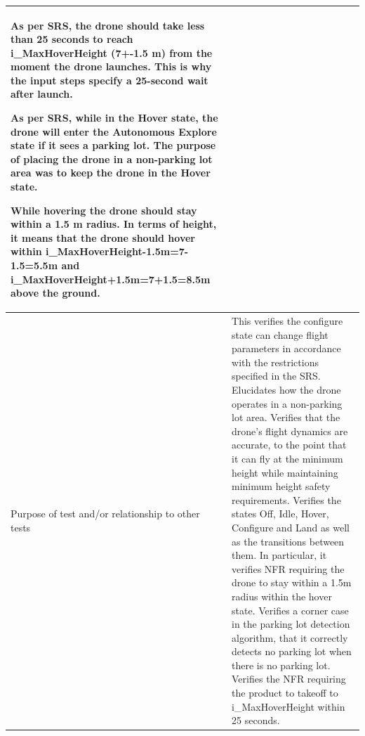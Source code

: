\documentclass[12pt, titlepage]{article}
\begin{document}
\begin{table}[!h]
\begin{center}
\begin{tabular}{ | m{1.5cm} | m{15cm} | }
As per SRS, the drone should take less than 25 seconds to reach i\_MaxHoverHeight (7+-1.5 m) from the moment the drone launches. This is why the input steps specify a 25-second wait after launch.

As per SRS, while in the Hover state, the drone will enter the Autonomous Explore state if it sees a parking lot. The purpose of placing the drone in a non-parking lot area was to keep the drone in the Hover state.

While hovering the drone should stay within a 1.5 m radius. In terms of height, it means that the drone should hover within i\_MaxHoverHeight-1.5m=7-1.5=5.5m and i\_MaxHoverHeight+1.5m=7+1.5=8.5m above the ground.  
\\ 
\hline
Purpose of test and/or relationship to other tests & This verifies the configure state can change flight parameters in accordance with the restrictions specified in the SRS. 
Elucidates how the drone operates in a non-parking lot area.
Verifies that the drone's flight dynamics are accurate, to the point that it can fly at the minimum height while maintaining minimum height safety requirements.
Verifies the states Off, Idle, Hover, Configure and Land as well as the transitions between them. In particular, it verifies NFR requiring the drone to stay within a 1.5m radius within the hover state. 
Verifies a corner case in the parking lot detection algorithm, that it correctly detects no parking lot when there is no parking lot.
Verifies the NFR requiring the product to takeoff to i\_MaxHoverHeight within 25 seconds. \\ 
\hline
\end{tabular}
\end{center}
\end{table}
\end{document}
